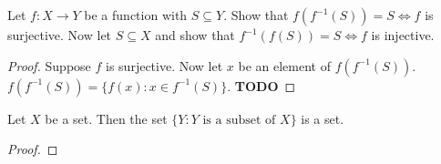 \documentclass[12pt]{article}
\newenvironment{lemma}[2][Lemma]{\begin{trivlist}
\item[\hskip \labelsep {\bfseries #1}\hskip \labelsep {\bfseries #2}]}{\end{trivlist}}
\newenvironment{exercise}[2][Exercise]{\begin{trivlist}
\item[\hskip \labelsep {\bfseries #1}\hskip \labelsep {\bfseries #2}]}{\end{trivlist}}
\begin{document}
\begin{exercise}{3.4.5}
	Let $ f : X \to Y $ be a function with $ S \subseteq Y $.
	Show that $ f(f^{-1}(S)) = S \iff f $ is surjective.
	Now let $ S \subseteq X $ and show that $ f^{-1}(f(S)) = S \iff f $ is injective.
\end{exercise}
\begin{proof}
	Suppose $ f $ is surjective.
	Now let $ x $ be an element of $ f(f^{-1}(S)) $.
	$ f(f^{-1}(S)) = \{ f(x) : x \in f^{-1}(S) \} $.
	\textbf{TODO}
\end{proof}

\begin{lemma}{3.4.9}
	Let $ X $ be a set.
	Then the set $ \{ Y : Y \text{ is a subset of } X \} $ is a set.
\end{lemma}
\begin{proof}
	
\end{proof}
\end{document}
